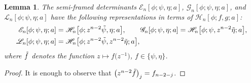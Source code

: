 \documentclass[10pt,a4paper]{amsart}
\numberwithin{equation}{section}
\newtheorem{Lemma}[Theorem]{Lemma}
 { \theoremstyle{definition}
\newtheorem{Definition}[Theorem]{Definition}
\newtheorem{Example}[Theorem]{Example}
\newtheorem{Remark}[Theorem]{Remark}
\newtheorem{Question}[Theorem]{Question}
}
\begin{document}
		\begin{Lemma}\label{EGL in terms of H}
			The semi-framed determinants $\mathscr{E}_n[\phi;\psi,\eta;a]$, $\mathscr{G}_n[\phi;\psi,\eta;a]$, and $\mathscr{L}_n[\phi;\psi,\eta;a]$ have the following representations in terms of $\mathscr{H}_n[\phi;f,g;a]$:
			\begin{align*}
				\mathscr{E}_n[\phi;\psi,\eta;a] & = \mathscr{H}_n\big[\phi;z^{n-2}\Tilde{\psi},\eta;a\big], \qquad
				\mathscr{G}_n[\phi;\psi,\eta;a] = \mathscr{H}_n\big[\phi;\psi,z^{n-2}\Tilde{\eta};a\big], \\
				\mathscr{L}_n[\phi;\psi,\eta;a] & = \mathscr{H}_n\big[\phi;z^{n-2}\Tilde{\psi},z^{n-2}\Tilde{\eta};a\big],
			\end{align*}
			where $\Tilde{f}$ denotes the function $z \mapsto f\big(z^{-1}\big)$, $f \in \{\psi,\eta\}$.
		\end{Lemma}
		\begin{proof}
			It is enough to observe that $\big( z^{n-2}\Tilde{f} \big)_j = f_{n-2-j}$.
		\end{proof}
		
\end{document}
